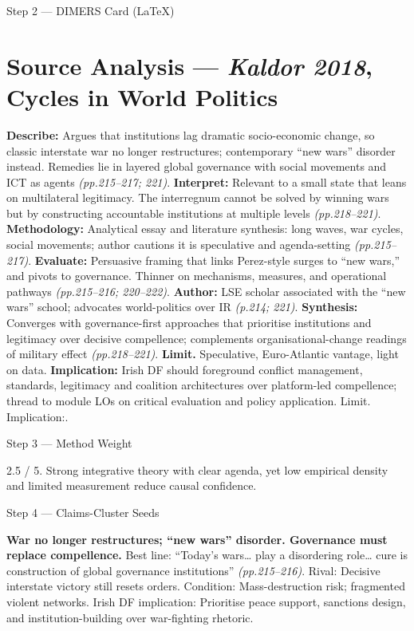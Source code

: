 \parencite{KALDOR_2018}
Step 2 — DIMERS Card (LaTeX)

\section*{Source Analysis — \textit{Kaldor 2018}, Cycles in World Politics}
\textbf{Describe:} Argues that institutions lag dramatic socio-economic change, so classic interstate war no longer restructures; contemporary “new wars” disorder instead. Remedies lie in layered global governance with social movements and ICT as agents \emph{(pp.215–217; 221)}.
\textbf{Interpret:} Relevant to a small state that leans on multilateral legitimacy. The interregnum cannot be solved by winning wars but by constructing accountable institutions at multiple levels \emph{(pp.218–221)}.
\textbf{Methodology:} Analytical essay and literature synthesis: long waves, war cycles, social movements; author cautions it is speculative and agenda-setting \emph{(pp.215–217)}.
\textbf{Evaluate:} Persuasive framing that links Perez-style surges to “new wars,” and pivots to governance. Thinner on mechanisms, measures, and operational pathways \emph{(pp.215–216; 220–222)}.
\textbf{Author:} LSE scholar associated with the “new wars” school; advocates world-politics over IR \emph{(p.214; 221)}.
\textbf{Synthesis:} Converges with governance-first approaches that prioritise institutions and legitimacy over decisive compellence; complements organisational-change readings of military effect \emph{(pp.218–221)}.
\textbf{Limit.} Speculative, Euro-Atlantic vantage, light on data. \textbf{Implication:} Irish DF should foreground conflict management, standards, legitimacy and coalition architectures over platform-led compellence; thread to module LOs on critical evaluation and policy application. Limit. Implication:.

Step 3 — Method Weight

2.5 / 5. Strong integrative theory with clear agenda, yet low empirical density and limited measurement reduce causal confidence.

Step 4 — Claims-Cluster Seeds

\textbf{War no longer restructures; “new wars” disorder. Governance must replace compellence.}
Best line: “Today’s wars… play a disordering role… cure is construction of global governance institutions” \emph{(pp.215–216)}. Rival: Decisive interstate victory still resets orders. Condition: Mass-destruction risk; fragmented violent networks. Irish DF implication: Prioritise peace support, sanctions design, and institution-building over war-fighting rhetoric.

